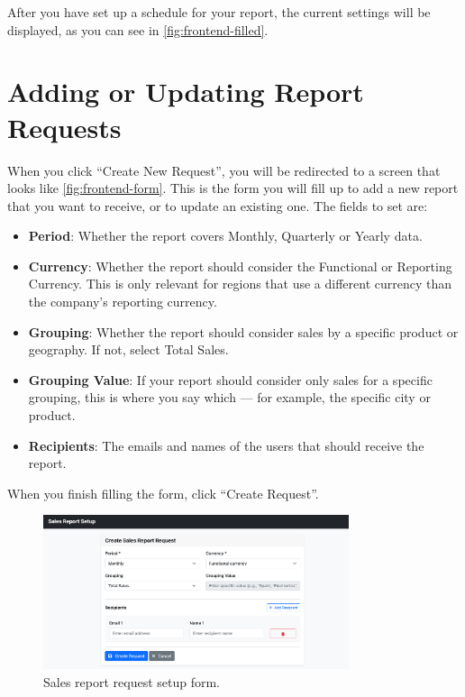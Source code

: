 \documentclass[a4paper]{report}
\begin{document}
After you have set up a schedule for your report, the current settings will be displayed, as you can see in \autoref{fig:frontend-filled}.

\section{Adding or Updating Report Requests}
\label{annex:user-manual-report-request}

When you click ``Create New Request'', you will be redirected to a screen that looks like \autoref{fig:frontend-form}. This is the form you will fill up to add a new report that you want to receive, or to update an existing one. The fields to set are:

\begin{itemize}
    \item \textbf{Period}: Whether the report covers Monthly, Quarterly or Yearly data.
    \item \textbf{Currency}: Whether the report should consider the Functional or Reporting Currency. This is only relevant for regions that use a different currency than the company's reporting currency.
    \item \textbf{Grouping}: Whether the report should consider sales by a specific product or geography. If not, select Total Sales.
    \item \textbf{Grouping Value}: If your report should consider only sales for a specific grouping, this is where you say which --- for example, the specific city or product.
    \item \textbf{Recipients}: The emails and names of the users that should receive the report.
\end{itemize}

When you finish filling the form, click ``Create Request''.

\begin{figure}[h]
\centering
\includegraphics[width=0.8\textwidth]{images/frontend-form.png}
\caption{Sales report request setup form.}
\label{fig:frontend-form}
\end{figure}
\end{document}
